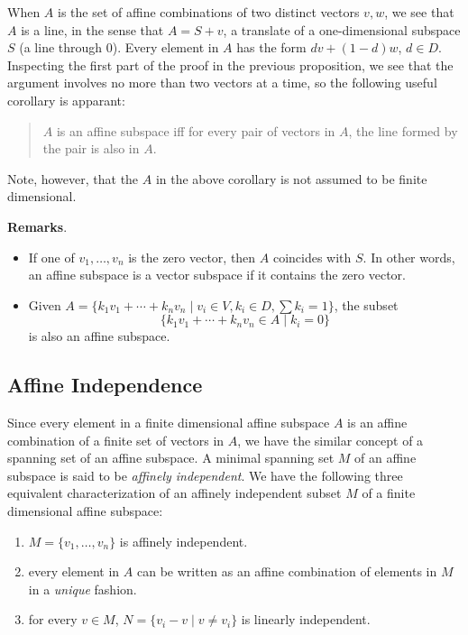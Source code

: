 \documentclass[12pt]{article}
\begin{document}
When $A$ is the set of affine combinations of two distinct vectors $v,w$, we see that $A$ is a line, in the sense that $A=S+v$, a translate of a one-dimensional subspace $S$ (a line through 0).  Every element in $A$ has the form $dv+(1-d)w$, $d\in D$.  Inspecting the first part of the proof in the previous proposition, we see that the argument involves no more than two vectors at a time, so the following useful corollary is apparant:

\begin{quote}
$A$ is an affine subspace iff for every pair of vectors in $A$, the line formed by the pair is also in $A$.
\end{quote}

Note, however, that the $A$ in the above corollary is not assumed to be finite dimensional.

\textbf{Remarks}.  
\begin{itemize}
\item
If one of $v_1,\ldots,v_n$ is the zero vector, then $A$ coincides with $S$.  In other words, an affine subspace is a vector subspace if it contains the zero vector.
\item
Given $A=\lbrace k_1v_1+\cdots +k_nv_n \mid v_i\in V, k_i\in D, \sum k_i=1 \rbrace$, the subset $$\lbrace k_1v_1+\cdots+ k_nv_n\in A\mid k_i=0\rbrace$$ is also an affine subspace.
\end{itemize}

\subsection*{Affine Independence}

Since every element in a finite dimensional affine subspace $A$ is an affine combination of a finite set of vectors in $A$, we have the similar concept of a spanning set of an affine subspace.  A minimal spanning set $M$ of an affine subspace is said to be \emph{affinely independent}.  We have the following three equivalent characterization of an affinely independent subset $M$ of a finite dimensional affine subspace:
\begin{enumerate}
\item $M=\lbrace v_1,\ldots,v_n\rbrace$ is affinely independent.
\item every element in $A$ can be written as an affine combination of elements in $M$ in a \emph{unique} fashion.
\item for every $v\in M$, $N=\lbrace v_i-v\mid v\neq v_i\rbrace$ is linearly independent.
\end{enumerate}
\end{document}
